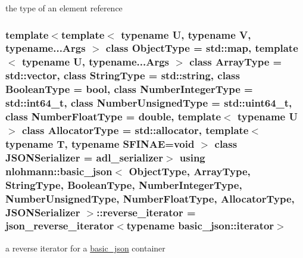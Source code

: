 the type of an element reference 

\subsubsection[{\texorpdfstring{reverse\+\_\+iterator}{reverse_iterator}}]{\setlength{\rightskip}{0pt plus 5cm}template$<$template$<$ typename U, typename V, typename...\+Args $>$ class Object\+Type = std\+::map, template$<$ typename U, typename...\+Args $>$ class Array\+Type = std\+::vector, class String\+Type  = std\+::string, class Boolean\+Type  = bool, class Number\+Integer\+Type  = std\+::int64\+\_\+t, class Number\+Unsigned\+Type  = std\+::uint64\+\_\+t, class Number\+Float\+Type  = double, template$<$ typename U $>$ class Allocator\+Type = std\+::allocator, template$<$ typename T, typename S\+F\+I\+N\+A\+E=void $>$ class J\+S\+O\+N\+Serializer = adl\+\_\+serializer$>$ using {\bf nlohmann\+::basic\+\_\+json}$<$ Object\+Type, Array\+Type, String\+Type, Boolean\+Type, Number\+Integer\+Type, Number\+Unsigned\+Type, Number\+Float\+Type, Allocator\+Type, J\+S\+O\+N\+Serializer $>$\+::{\bf reverse\+\_\+iterator} =  {\bf json\+\_\+reverse\+\_\+iterator}$<$typename {\bf basic\+\_\+json\+::iterator}$>$}\hypertarget{classnlohmann_1_1basic__json_ac223d5560c2b05a208c88de67376c5f2}{}\label{classnlohmann_1_1basic__json_ac223d5560c2b05a208c88de67376c5f2}


a reverse iterator for a \hyperlink{classnlohmann_1_1basic__json}{basic\+\_\+json} container 

